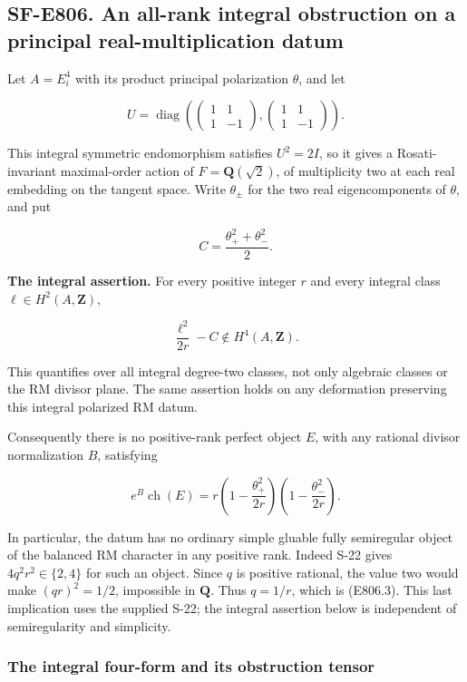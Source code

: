 \subsection{SF-E806. An all-rank integral obstruction on a principal
real-multiplication
datum}\label{SF-E806}

Let \(A=E_i^4\) with its product principal polarization \(\theta\), and
let

\[
 U=\operatorname{diag}\left(
 \begin{pmatrix}1&1\\1&-1\end{pmatrix},
 \begin{pmatrix}1&1\\1&-1\end{pmatrix}\right).
 \tag{E806.1}
\]

This integral symmetric endomorphism satisfies \(U^2=2I\), so it gives a
Rosati-invariant maximal-order action of \(F=\mathbf Q(\sqrt2)\), of
multiplicity two at each real embedding on the tangent space. Write
\(\theta_\pm\) for the two real eigencomponents of \(\theta\), and put

\[
 C=\frac{\theta_+^2+\theta_-^2}{2}.
\]

\textbf{The integral assertion.} For every positive integer \(r\) and
every integral class \(\ell\in H^2(A,\mathbf Z)\),

\[
 \frac{\ell^2}{2r}-C\notin H^4(A,\mathbf Z).
 \tag{E806.2}
\]

This quantifies over all integral degree-two classes, not only algebraic
classes or the RM divisor plane. The same assertion holds on any
deformation preserving this integral polarized RM datum.

Consequently there is no positive-rank perfect object \(E\), with any
rational divisor normalization \(B\), satisfying

\[
 e^B\operatorname{ch}(E)
 =r\left(1-\frac{\theta_+^2}{2r}\right)
     \left(1-\frac{\theta_-^2}{2r}\right).
 \tag{E806.3}
\]

In particular, the datum has no ordinary simple gluable fully
semiregular object of the balanced RM character in any positive rank.
Indeed S-22 gives \(4q^2r^2\in\{2,4\}\) for such an object. Since \(q\)
is positive rational, the value two would make \((qr)^2=1/2\),
impossible in \(\mathbf Q\). Thus \(q=1/r\), which is (E806.3). This
last implication uses the supplied S-22; the integral assertion below is
independent of semiregularity and simplicity.

\subsubsection{The integral four-form and its obstruction
tensor}\label{the-integral-four-form-and-its-obstruction-tensor}

